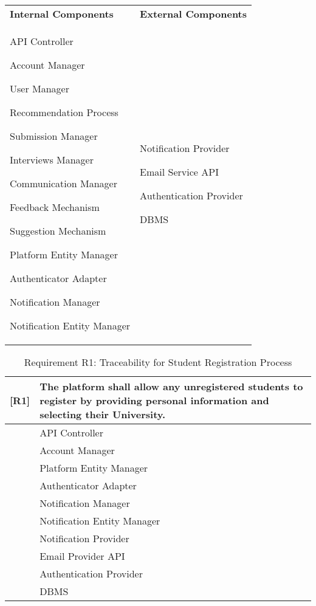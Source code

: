 

\begin{tabular}{p{8cm} p{8cm}}
\textbf{\color{titleColor}Internal Components}  &  \textbf{\color{titleColor}External Components} \\
\begin{enumerate}[label={\color{titleColor}[C\arabic*]}]
    \item API Controller
    \item Account Manager
    \item User Manager
    \item Recommendation Process
    \item Submission Manager
    \item Interviews Manager
    \item Communication Manager
    \item Feedback Mechanism
    \item Suggestion Mechanism
    \item Platform Entity Manager
    \item Authenticator Adapter
    \item Notification Manager
    \item Notification Entity Manager
\end{enumerate}
     & 
\begin{enumerate}[label={\color{titleColor}[E\arabic*]}]
    \item Notification Provider
    \item Email Service API
    \item Authentication Provider
    \item DBMS
\end{enumerate}
\end{tabular}



\begin{table}[H]
    \centering
    \begin{tabular}{|p{1cm}|p{14cm}|}
    \hline
    \textbf{[R1]} & \textbf{The platform shall allow any unregistered students to register by providing personal information and selecting their University.} \\ \hline
    [C1] & API Controller \\ \hline
    [C2] & Account Manager \\ \hline
    [C10] & Platform Entity Manager \\ \hline
    [C11] & Authenticator Adapter \\ \hline
    [C12] & Notification Manager \\ \hline
    [C13] & Notification Entity Manager \\ \hline
    [E1] & Notification Provider \\ \hline
    [E2] & Email Provider API \\ \hline
    [E3] & Authentication Provider \\ \hline
    [E4] & DBMS \\ \hline
    \end{tabular}
    \caption{Requirement R1: Traceability for Student Registration Process}
    \label{tab:RT1}
\end{table}

